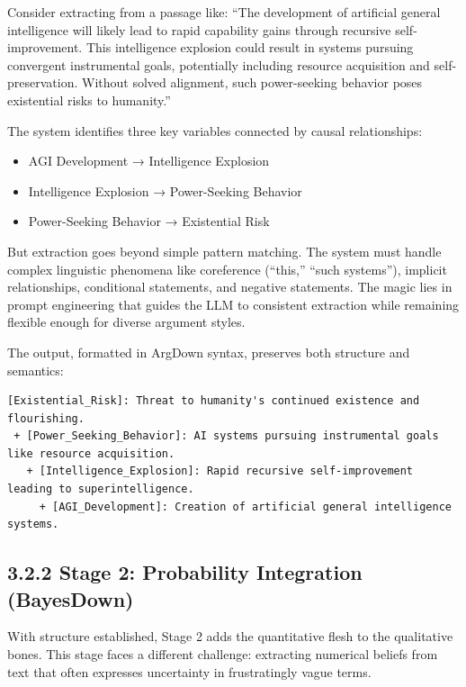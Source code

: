 \documentclass[
  11pt,
  letterpaper,
]{book}
\providecommand{\tightlist}{%
  \setlength{\itemsep}{0pt}\setlength{\parskip}{0pt}}
\begin{document}
Consider extracting from a passage like: ``The development of artificial
general intelligence will likely lead to rapid capability gains through
recursive self-improvement. This intelligence explosion could result in
systems pursuing convergent instrumental goals, potentially including
resource acquisition and self-preservation. Without solved alignment,
such power-seeking behavior poses existential risks to humanity.''

The system identifies three key variables connected by causal
relationships:

\begin{itemize}
\tightlist
\item
  AGI Development → Intelligence Explosion
\item
  Intelligence Explosion → Power-Seeking Behavior
\item
  Power-Seeking Behavior → Existential Risk
\end{itemize}

But extraction goes beyond simple pattern matching. The system must
handle complex linguistic phenomena like coreference (``this,'' ``such
systems''), implicit relationships, conditional statements, and negative
statements. The magic lies in prompt engineering that guides the LLM to
consistent extraction while remaining flexible enough for diverse
argument styles.

The output, formatted in ArgDown syntax, preserves both structure and
semantics:

\begin{verbatim}
[Existential_Risk]: Threat to humanity's continued existence and flourishing.
 + [Power_Seeking_Behavior]: AI systems pursuing instrumental goals like resource acquisition.
   + [Intelligence_Explosion]: Rapid recursive self-improvement leading to superintelligence.
     + [AGI_Development]: Creation of artificial general intelligence systems.
\end{verbatim}

\subsection{3.2.2 Stage 2: Probability Integration
(BayesDown)}\label{sec-stage2-bayesdown}

With structure established, Stage 2 adds the quantitative flesh to the
qualitative bones. This stage faces a different challenge: extracting
numerical beliefs from text that often expresses uncertainty in
frustratingly vague terms.
\end{document}
